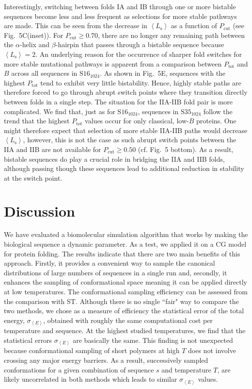 \documentclass[
aip,
rsi,%
amsmath,amssymb,
reprint,%
]{revtex4-1}
\newcommand	 {\sbar}	{{s}}
\newcommand {\Pcut}     	{{P_\mathrm{cut}}}
\newcommand {\Ptot}	{{P_\mathrm{tot}}}
\newcommand {\sigE}	{{\sigma_{\left < E \right >}}}
\newcommand {\SI}		{${\mathrm{S16}_{1024}}$}
\newcommand {\SII}		{${\mathrm{S35}_{1024}}$}
\begin{document}
Interestingly, switching between folds IA and IB through one or more bistable sequences become less and less frequent as selections for more stable pathways are made. This can be seen from the decrease in $\left <L_\mathrm{s}\right >$ as a function of $\Pcut$ (see Fig.~5C(inset)). For $\Pcut\ge0.70$, there are no longer any remaining path between the $\alpha$-helix and $\beta$-hairpin that passes through a bistable sequence because $\left <L_\mathrm{s}\right > =  2$. An underlying reason for the occurrence of sharper fold switches for more stable mutational pathways is apparent from a comparison between $\Ptot$ and $B$ across all sequences in {\SI}. As shown in Fig.~5E, sequences with the highest $\Ptot$ tend to exhibit very little bistability. Hence, highly stable paths are therefore forced to go through abrupt switch points where they transition directly between folds in a single step. The situation for the IIA-IIB fold pair is more complicated. We find that, just as for {\SI}, sequences in {\SII} follow the trend that the highest $\Ptot$ values occur for only classical, low-$B$ proteins. One might therefore expect that selection of more stable IIA-IIB paths would decrease $\left <L_\mathrm{s}\right >$, however, this is not the case as such abrupt switch points between the IIA and IIB are not available for $\Pcut\ge0.50$ (cf. Fig.~5 bottom). As a result, bistable sequences do play a crucial role in bridging the IIA and IIB folds, although passing though these sequences lead to additional reduction in stability at the switch point. 
 
\section{Discussion}

We have evaluated a biomolecular simulation algorithm that works by making the biological sequence a dynamic parameter. As a test, we applied it on a CG model for protein folding. The results indicate that there are two main benefits of this approach. Firstly, it provides a convenient way to sample the canonical distributions of large numbers of sequences in a single run and, secondly, it enhances the sampling of conformational space meaning it can be applied directly at low temperatures. The conformational sampling efficiency can be assessed from the comparison with ST. Although there is no single ``fair" way to compare the two methods, we chose as a measure of efficiency the statistical error of the total energy, $\sigE$, obtained with roughly the same computational cost per temperature and sequence. At the highest studied temperatures, we find that the statistical errors $\sigE$ are basically the same. This finding is not unexpected because conformational sampling of short polymers at high $T$ does not involve crossing any major energy barriers. As a result, successively sampled conformations for a given combination of sequence $\sbar$ and temperature $T$, are likely uncorrelated in both methods which leads to similar $\sigE$ values. 
\end{document}
